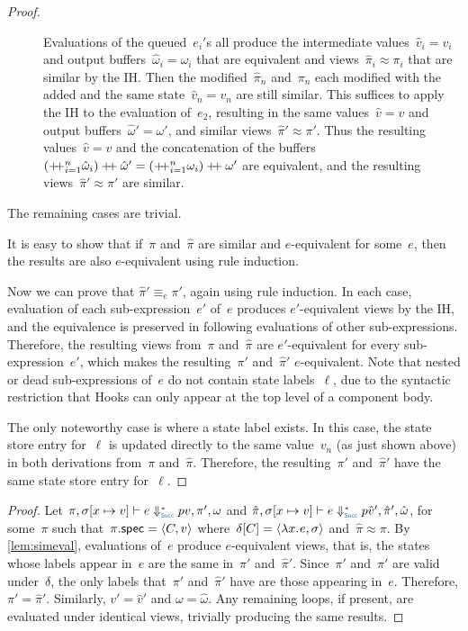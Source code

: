\begin{proof}
\begin{description}
    \item[{\normalfont{}}]
      Evaluations of the queued~$e_i'$s all produce the intermediate values~$\hat v_i = v_i$ and output buffers~$\hat \omega_i = \omega_i$ that are equivalent and views~$\hat\pi_i \approx \pi_i$ that are similar by the IH.
      Then the modified~$\hat\pi_n$ and~$\pi_n$ each modified with the added  and the same state~$\hat v_n = v_n$ are still similar.
      This suffices to apply the IH to the evaluation of~$e_2$, resulting in the same values~$\hat v = v$ and output buffers~$\hat\omega' = \omega'$, and similar views~$\hat\pi' \approx \pi'$.
      Thus the resulting values~$\hat v = v$ and the concatenation of the buffers~$(\mathbin{+\negthickspace+}_{i=1}^n \hat \omega_i) \mathbin{+\negthickspace+} \hat\omega' = (\mathbin{+\negthickspace+}_{i=1}^n \omega_i) \mathbin{+\negthickspace+} \omega'$ are equivalent, and the resulting views~$\hat\pi' \approx \pi'$ are similar.
  \end{description}
  The remaining cases are trivial.

  It is easy to show that if~$\pi$ and~$\hat \pi$ are similar and $e$-equivalent for some~$e$, then the results are also $e$-equivalent using rule induction.

  Now we can prove that $\hat\pi' \equiv_e \pi'$, again using rule induction.
  In each case, evaluation of each sub-expression~$e'$ of~$e$ produces $e'$-equivalent views by the IH, and the equivalence is preserved in following evaluations of other sub-expressions.
  Therefore, the resulting views from~$\pi$ and~$\hat \pi$ are $e'$-equivalent for every sub-expression~$e'$, which makes the resulting~$\pi'$ and~$\hat \pi'$ $e$-equivalent.
  Note that nested or dead sub-expressions of~$e$ do not contain state labels~$\ell$, due to the syntactic restriction that Hooks can only appear at the top level of a component body.

  The only noteworthy case is  where a state label exists.
  In this case, the state store entry for~$\ell$ is updated directly to the same value~$v_n$ (as just shown above) in both derivations from~$\pi$ and~$\hat \pi$.
  Therefore, the resulting~$\pi'$ and~$\hat \pi'$ have the same state store entry for~$\ell$.
\end{proof}

\simevallem*

\begin{proof}
  Let $\Step*<\phase{Succ}>[\pi,\sigma[x\mapsto v]]{e}{v,\pi',\omega}$ and $\Step*<\phase{Succ}>[\hat \pi,\sigma[x\mapsto v]]{e}{\hat v',\hat \pi', \hat \omega}$, for some~$\pi$ such that~$\pi.\textup{\textsf{spec}} = \langle C, v\rangle$ where~$\delta[C] = \langle\lambda x.\mskip 1mue, \sigma\rangle$ and~$\hat\pi \approx \pi$.
  By \cref{lem:simeval}, evaluations of~$e$ produce $e$-equivalent views, that is, the states whose labels appear in~$e$ are the same in~$\pi'$ and~$\hat \pi'$.
  Since~$\pi'$ and~$\hat \pi'$ are valid under~$\delta$, the only labels that~$\pi'$ and~$\hat \pi'$ have are those appearing in~$e$.
  Therefore, $\pi' = \hat \pi'$.
  Similarly, $v' = \hat v'$ and $\omega = \hat \omega$.
  Any remaining loops, if present, are evaluated under identical views, trivially producing the same results.
\end{proof}

